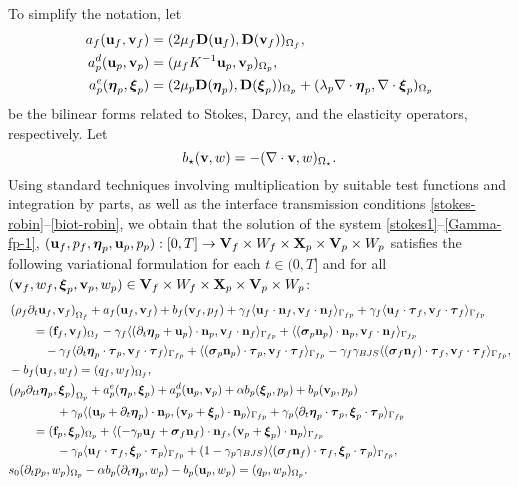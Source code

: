 \documentclass[11pt]{article}
\def\u{{\bf u}}
\def\bv{{\bf v}}
\def\n{{\bf n}}
\def\f{{\bf f}}
\def\btau{\boldsymbol{\tau}}
\def\bbeta{\boldsymbol{\eta}}
\def\bs{\boldsymbol{\sigma}}
\def\bxi{\boldsymbol{\xi}}
\def\V{{\bf V}}
\def\D{{\bf D}}
\def\X{{\bf X}}
\def\d{\partial}
\def\grad{\nabla}
\def\div{\grad\cdot}
\def\O{\Omega}
\def\<{\langle}
\def\>{\rangle}
\begin{document}
To simplify the notation, let
%
\begin{align*}
a_{f}(\u_{f},\bv_{f}) &= (2\mu_{f}\D(\u_{f}),\D(\bv_{f}))_{\O_{f}},
\\
a^d_{p}(\u_{p},\bv_{p}) &= (\mu_{f} K^{-1}\u_{p},\bv_{p})_{\O_{p}},
\\
a^e_{p}(\bbeta_p,\bxi_p) &= (2\mu_p\D(\bbeta_p),\D(\bxi_p))_{\O_{p}}+(\lambda_p\nabla\cdot\bbeta_p,\nabla\cdot\bxi_p)_{\O_{p}}
\end{align*}
%
be the bilinear forms related to Stokes, Darcy, and the elasticity
operators, respectively.  Let 
%
$$
b_{\star}(\bv,w) = -(\div \bv,w)_{\O_\star}.
$$
Using standard techniques involving multiplication by suitable test functions and integration by parts, as well as the interface transmission conditions \eqref{stokes-robin}--\eqref{biot-robin}, we obtain that the solution of the system \eqref{stokes1}--\eqref{Gamma-fp-1}, $(\u_{f}, p_{f}, \bbeta_{p},\u_p,p_{p}): [0,T] \to \V_f\times W_f\times \X_p \times \V_p \times W_p$
satisfies the following variational formulation for each $t \in (0,T]$ and for all $(\bv_f,w_f,\bxi_p,\bv_p,w_p) \in \V_f\times W_f \times \X_p \times \V_p \times W_p$:
%
\begin{align}
  & \left(\rho_f {\partial_t \u_{f}},\bv_{f}\right)_{\O_f}  + a_{f}(\u_{f},\bv_{f}) + b_f(\bv_{f},p_{f})
  + \gamma_f\<\u_f\cdot\n_f,\bv_f\cdot\n_f\>_{\Gamma_{fp}}
  +  \gamma_f\<\u_f\cdot\btau_{f},\bv_f\cdot\btau_{f}\>_{\Gamma_{fp}}
  \nonumber \\
  & \qquad  
  = (\f_{f},\bv_{f})_{\O_f}
  - \gamma_f\<(\d_t \bbeta_p + \u_p)\cdot\n_p,\bv_f\cdot\n_{f}\>_{\Gamma_{fp}} 
  + \<(\bs_p \n_p)\cdot\n_p,\bv_f\cdot\n_{f}\>_{\Gamma_{fp}}
  \nonumber \\
  & \qquad\quad
  - \gamma_f\<\d_t\bbeta_p\cdot\btau_p,\bv_f\cdot\btau_{f}\>_{\Gamma_{fp}}
  + \<(\bs_p\n_p)\cdot\btau_p,\bv_f\cdot\btau_{f}\>_{\Gamma_{fp}} 
  - \gamma_f\gamma_{BJS}\<(\bs_f\n_f)\cdot\btau_{f},\bv_f\cdot\btau_{f}\>_{\Gamma_{fp}}, \label{semi-1}\\
  & - b_f(\u_{f},w_{f}) = (q_{f},w_{f})_{\O_f}, \label{semi-2}\\
  &\big( \rho_p \d_{tt} \bbeta_{p},\bxi_{p}\big)_{\O_p}
  + a^e_{p}(\bbeta_{p},\bxi_{p})
  + a^d_{p}(\u_{p},\bv_{p})
  + \alpha b_p(\bxi_{p},p_{p})
  + b_p(\bv_{p},p_{p})
  \nonumber \\
  & \qquad\qquad  + \gamma_p\<(\u_p + \d_t\bbeta_p)\cdot\n_p,
        (\bv_p + \bxi_p)\cdot\n_p\>_{\Gamma_{fp}}
  + \gamma_p\<\d_t\bbeta_p\cdot\btau_p,\bxi_p\cdot\btau_p\>_{\Gamma_{fp}}
  \nonumber \\
  & \qquad = (\f_{p},\bxi_{p})_{\O_p} + \<(-\gamma_p\u_f + \bs_f\n_f)\cdot\n_f,
  (\bv_p + \bxi_p)\cdot\n_p\>_{\Gamma_{fp}} \nonumber \\
  & \qquad\qquad -\gamma_p\<\u_f\cdot\btau_f,\bxi_p\cdot\btau_p\>_{\Gamma_{fp}}
  +(1- \gamma_p\gamma_{BJS})\<(\bs_f\n_f)\cdot\btau_f,\bxi_p\cdot\btau_p\>_{\Gamma_{fp}}, \label{semi-3}\\
  & s_0 (\d_t p_{p},w_{p})_{\O_p} - \alpha b_p(\d_t\bbeta_{p},w_{p}) - b_p(\u_{p},w_{p}) = (q_{p},w_{p})_{\O_p}. \label{semi-4}
\end{align}
\end{document}
